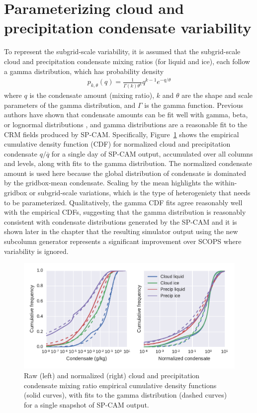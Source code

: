 \section{Parameterizing cloud and precipitation condensate
variability}\label{sec:subgrid2Variability}

To represent the subgrid-scale variability, it is assumed that the
subgrid-scale cloud and precipitation condensate mixing ratios (for
liquid and ice), each follow a gamma distribution, which has probability
density \[\begin{gathered} 
    p_{k, \theta}(q) 
        = \frac{1}{\Gamma(k) \theta^k} q^{k - 1} e^{-q/\theta}
\end{gathered}\] where \(q\) is the condensate amount (mixing ratio),
\(k\) and \(\theta\) are the shape and scale parameters of the gamma
distribution, and \(\Gamma\) is the gamma function. Previous authors
have shown that condensate amounts can be fit well with gamma, beta, or
lognormal distributions \citep[e.g.,][]{lee_et_al_2010}, and gamma
distributions are a reasonable fit to the CRM fields produced by SP-CAM.
Specifically, Figure~\ref{fig:mxratioCDF} shows the empirical cumulative
density function (CDF) for normalized cloud and precipitation condensate
\(q / \overline{q}\) for a single day of SP-CAM output, accumulated over
all columns and levels, along with fits to the gamma distribution. The
normalized condensate amount is used here because the global
distribution of condensate is dominated by the gridbox-mean condensate.
Scaling by the mean highlights the within-gridbox or subgrid-scale
variations, which is the type of heterogeniety that needs to be
parameterized. Qualitatively, the gamma CDF fits agree reasonably well
with the empirical CDFs, suggesting that the gamma distribution is
reasonably consistent with condensate distributions generated by the
SP-CAM and it is shown later in the chapter that the resulting simulator
output using the new subcolumn generator represents a significant
improvement over SCOPS where variability is ignored.

\begin{figure}[htbp]
\centering
\includegraphics{graphics/subgrid2_mxratio_cdf1.pdf}
\caption{\label{fig:mxratioCDF}Raw (left) and normalized (right) cloud
and precipitation condensate mixing ratio empirical cumulative density
functions (solid curves), with fits to the gamma distribution (dashed
curves) for a single snapshot of SP-CAM output.}\label{fig:mxratioCDF}
\end{figure}


